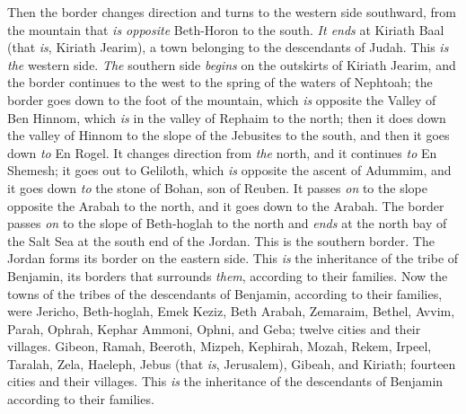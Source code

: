 \begin{biblechapter}
\verse Then the border changes direction and turns to the western side southward, from the mountain that \textit{is opposite} Beth-Horon to the south. \textit{It ends} at Kiriath Baal (that \textit{is}, Kiriath Jearim), a town belonging to the descendants of Judah. This \textit{is the} western side.
\verse \textit{The} southern side \textit{begins} on the outskirts of Kiriath Jearim, and the border continues to the west to the spring of the waters of Nephtoah;
\verse the border goes down to the foot of the mountain, which \textit{is} opposite the Valley of Ben Hinnom, which \textit{is} in the valley of Rephaim to the north; then it does down the valley of Hinnom to the slope of the Jebusites to the south, and then it goes down \textit{to} En Rogel.
\verse It changes direction from \textit{the} north, and it continues \textit{to} En Shemesh; it goes out to Geliloth, which \textit{is} opposite the ascent of Adummim, and it goes down \textit{to} the stone of Bohan, son of Reuben.
\verse It passes \textit{on} to the slope opposite the Arabah to the north, and it goes down to the Arabah.
\verse The border passes \textit{on} to the slope of Beth-hoglah to the north and \textit{ends} at the north bay of the Salt Sea at the south end of the Jordan. This is the southern border.
\verse The Jordan forms its border on the eastern side. This \textit{is} the inheritance of the tribe of Benjamin, its borders that surrounds \textit{them}, according to their families.
\verse Now the towns of the tribes of the descendants of Benjamin, according to their families, were Jericho, Beth-hoglah, Emek Keziz,
\verse Beth Arabah, Zemaraim, Bethel,
\verse Avvim, Parah, Ophrah,
\verse Kephar Ammoni, Ophni, and Geba; twelve cities and their villages.
\verse Gibeon, Ramah, Beeroth,
\verse Mizpeh, Kephirah, Mozah,
\verse Rekem, Irpeel, Taralah,
\verse Zela, Haeleph, Jebus (that \textit{is}, Jerusalem), Gibeah, and Kiriath; fourteen cities and their villages. This \textit{is} the inheritance of the descendants of Benjamin according to their families.
\end{biblechapter}

